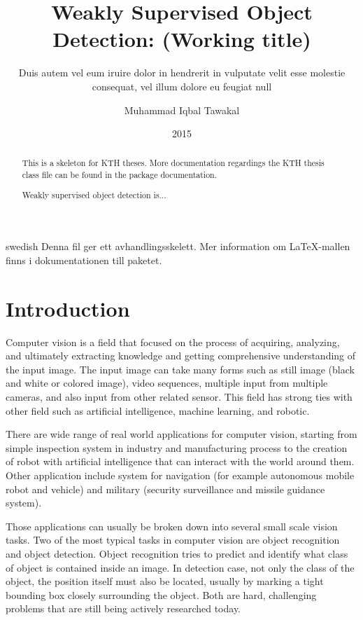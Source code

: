 \documentclass[a4paper,11pt]{kth-mag}
\title{Weakly Supervised Object Detection: (Working title)}
\subtitle{Duis autem vel eum iruire dolor in hendrerit in
          vulputate velit esse molestie consequat, vel illum
          dolore eu feugiat null}
\author{Muhammad Iqbal Tawakal}
\date{2015}
\begin{document}
\frontmatter
\pagestyle{empty}
\removepagenumbers
\maketitle
{}

\begin{abstract}
  This is a skeleton for KTH theses. More documentation
  regardings the KTH thesis class file can be found in
  the package documentation.
  
  Weakly supervised object detection is...
\end{abstract}

\clearpage
\begin{foreignabstract}{swedish}
  Denna fil ger ett avhandlingsskelett.
  Mer information om \LaTeX-mallen finns i
  dokumentationen till paketet.

\end{foreignabstract}
\clearpage
\tableofcontents*
\mainmatter
\pagestyle{newchap}


\chapter{Introduction}
\label{chap:intro}

Computer vision is a field that focused on the process of acquiring, analyzing, and ultimately extracting knowledge and getting comprehensive understanding of the input image. The input image can take many forms such as still image (black and white or colored image), video sequences, multiple input from multiple cameras, and also input from other related sensor. This field has strong ties with other field such as artificial intelligence, machine learning, and robotic.

There are wide range of real world applications for computer vision, starting from simple inspection system in industry and manufacturing process to the creation of robot with artificial intelligence that can interact with  the world around them. Other application include system for navigation (for example autonomous mobile robot and vehicle) and military (security surveillance and missile guidance system).

Those applications can usually be broken down into several small scale vision tasks. Two of the most typical tasks in computer vision are object recognition and object detection. Object recognition tries to predict and identify what class of object is contained inside an image. In detection case, not only the class of the object, the position itself must also be located, usually by marking a tight bounding box closely surrounding the object. Both are hard, challenging problems that are still being actively researched today.
\end{document}
